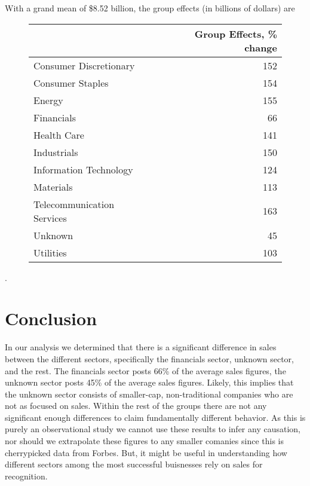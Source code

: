 \documentclass[a4paper]{article}
\begin{document}
With a grand mean of \$8.52 billion, the group effects (in billions of dollars) are 

\begin{figure}[H]
\centering
\begin{tabular}{l|r}
\hline
  & Group Effects, \% change\\
\hline
Consumer Discretionary & 152\\
\hline
Consumer Staples & 154\\
\hline
Energy & 155\\
\hline
Financials & 66\\
\hline
Health Care & 141\\
\hline
Industrials & 150\\
\hline
Information Technology & 124\\
\hline
Materials & 113\\
\hline
Telecommunication Services & 163\\
\hline
Unknown & 45\\
\hline
Utilities & 103\\
\hline
\end{tabular}
\end{figure}.



\section{Conclusion}%
\label{sec:Conclusion}
In our analysis we determined that there is a significant difference in sales between the different sectors, specifically the financials sector, unknown sector, and the rest. The financials sector posts 66\% of the average sales figures, the unknown sector posts 45\% of the average sales figures. Likely, this implies that the unknown sector consists of smaller-cap, non-traditional companies who are not as focused on sales. Within the rest of the groups there are not any significant enough differences to claim fundamentally different behavior. As this is purely an observational study we cannot use these results to infer any causation, nor should we extrapolate these figures to any smaller comanies since this is cherrypicked data from Forbes. But, it might be useful in understanding how different sectors among the most successful buisnesses rely on sales for recognition.
\end{document}
